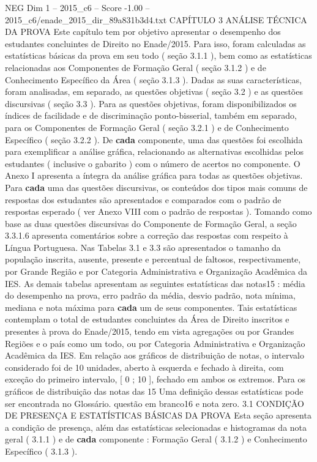 \begin{textsample}{NEG Dim 1 – 2015\_c6 – Score -1.00 – 2015\_c6/enade\_2015\_dir\_89a831b3d4.txt}  \label{ex:f1_neg_288}
CAPÍTULO 3 ANÁLISE TÉCNICA DA PROVA Este capítulo tem por objetivo apresentar o desempenho dos estudantes concluintes de Direito no Enade/2015.
Para isso, foram calculadas as estatísticas básicas da prova em seu todo ( seção 3.1.1 ), bem como as estatísticas relacionadas aos Componentes de Formação Geral ( seção 3.1.2 ) e de Conhecimento Específico da Área ( seção 3.1.3 ).
Dadas as suas características, foram analisadas, em separado, as questões objetivas ( seção 3.2 ) e as questões discursivas ( seção 3.3 ).
Para as questões objetivas, foram disponibilizados os índices de facilidade e de discriminação ponto-bisserial, também em separado, para os Componentes de Formação Geral ( seção 3.2.1 ) e de Conhecimento Específico ( seção 3.2.2 ).
De \textbf{cada} componente, uma das questões foi escolhida para exemplificar a análise gráfica, relacionando as alternativas escolhidas pelos estudantes ( inclusive o gabarito ) com o número de acertos no componente.
O Anexo I apresenta a íntegra da análise gráfica para todas as questões objetivas.
Para \textbf{cada} uma das questões discursivas, os conteúdos dos tipos mais comuns de respostas dos estudantes são apresentados e comparados com o padrão de respostas esperado ( ver Anexo VIII com o padrão de respostas ).
Tomando como base as duas questões discursivas do Componente de Formação Geral, a seção 3.3.1.6 apresenta comentários sobre a correção das respostas com respeito à Língua Portuguesa.
Nas Tabelas 3.1 e 3.3 são apresentados o tamanho da população inscrita, ausente, presente e percentual de faltosos, respectivamente, por Grande Região e por Categoria Administrativa e Organização Acadêmica da IES.
As demais tabelas apresentam as seguintes estatísticas das notas15 : média do desempenho na prova, erro padrão da média, desvio padrão, nota mínima, mediana e nota máxima para \textbf{cada} um de seus componentes.
Tais estatísticas contemplam o total de estudantes concluintes da Área de Direito inscritos e presentes à prova do Enade/2015, tendo em vista agregações ou por Grandes Regiões e o país como um todo, ou por Categoria Administrativa e Organização Acadêmica da IES.
Em relação aos gráficos de distribuição de notas, o intervalo considerado foi de 10 unidades, aberto à esquerda e fechado à direita, com exceção do primeiro intervalo, [ 0 ; 10 ], fechado em ambos os extremos.
Para os gráficos de distribuição das notas das 15 Uma definição dessas estatísticas pode ser encontrada no Glossário. questão em branco16 e nota zero. 3.1 CONDIÇÃO DE PRESENÇA E ESTATÍSTICAS BÁSICAS DA PROVA Esta seção apresenta a condição de presença, além das estatísticas selecionadas e histogramas da nota geral ( 3.1.1 ) e de \textbf{cada} componente : Formação Geral ( 3.1.2 ) e Conhecimento Específico ( 3.1.3 ).

\end{textsample}
